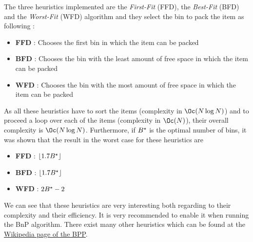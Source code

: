 The three heuristics implemented are the \textit{First-Fit} (FFD), the \textit{Best-Fit} (BFD) and the \textit{Worst-Fit} (WFD) algorithm and they select the bin to pack the item as following :
\begin{itemize}
	\item \textbf{FFD} :  Chooses the first bin in which the item can be packed
	\item \textbf{BFD} :  Chooses the bin with the least amount of free space in which the item can be packed
	\item \textbf{WFD} : Chooses the bin with the most amount of free space in which the item can be packed
\end{itemize}
As all these heuristics have to sort the items (complexity in $\Oc( N\log N)$) and to proceed a loop over each of the items (complexity in $\Oc (N)$), their overall complexity is $\Oc (N\log N)$. Furthermore, if ${B}^{\star}$ is the optimal number of bins, it was shown that the result in the worst case for these heuristics are
\begin{itemize}
	\item \textbf{FFD} :  $\lfloor1.7 {B}^{\star}\rfloor$ \cite{dosa2013first}
	\item \textbf{BFD} : $\lfloor1.7 {B}^{\star}\rfloor$ \cite{dosa2014optimal}
	\item \textbf{WFD} : $2{B}^{\star} - 2$ \cite{johnson1973near}
\end{itemize}
We can see that these heuristics are very interesting both regarding to their complexity and their efficiency. It is very recommended to enable it when running the BnP algorithm. There exist many other heuristics which can be found at the  \href{https://en.wikipedia.org/wiki/Bin_packing_problem#Online_Heuristics}{Wikipedia page of the BPP}.